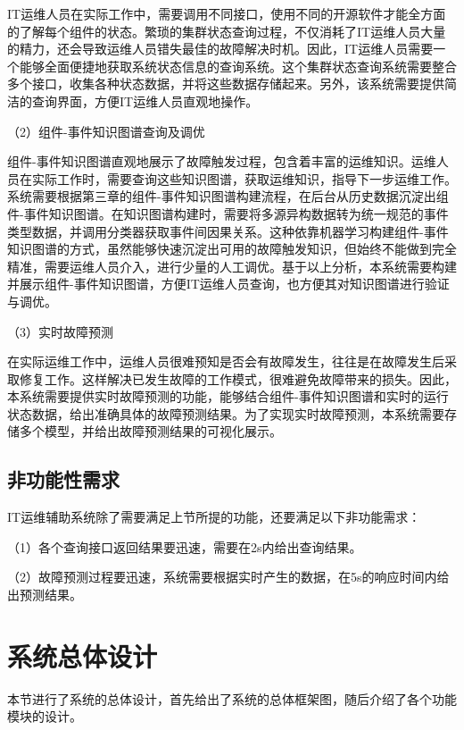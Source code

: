 IT运维人员在实际工作中，需要调用不同接口，使用不同的开源软件才能全方面的了解每个组件的状态。繁琐的集群状态查询过程，不仅消耗了IT运维人员大量的精力，还会导致运维人员错失最佳的故障解决时机。因此，IT运维人员需要一个能够全面便捷地获取系统状态信息的查询系统。这个集群状态查询系统需要整合多个接口，收集各种状态数据，并将这些数据存储起来。另外，该系统需要提供简洁的查询界面，方便IT运维人员直观地操作。

（2）组件-事件知识图谱查询及调优

组件-事件知识图谱直观地展示了故障触发过程，包含着丰富的运维知识。运维人员在实际工作时，需要查询这些知识图谱，获取运维知识，指导下一步运维工作。系统需要根据第三章的组件-事件知识图谱构建流程，在后台从历史数据沉淀出组件-事件知识图谱。在知识图谱构建时，需要将多源异构数据转为统一规范的事件类型数据，并调用分类器获取事件间因果关系。这种依靠机器学习构建组件-事件知识图谱的方式，虽然能够快速沉淀出可用的故障触发知识，但始终不能做到完全精准，需要运维人员介入，进行少量的人工调优。基于以上分析，本系统需要构建并展示组件-事件知识图谱，方便IT运维人员查询，也方便其对知识图谱进行验证与调优。

（3）实时故障预测

在实际运维工作中，运维人员很难预知是否会有故障发生，往往是在故障发生后采取修复工作。这样解决已发生故障的工作模式，很难避免故障带来的损失。因此，本系统需要提供实时故障预测的功能，能够结合组件-事件知识图谱和实时的运行状态数据，给出准确具体的故障预测结果。为了实现实时故障预测，本系统需要存储多个模型，并给出故障预测结果的可视化展示。


\subsection{非功能性需求}
IT运维辅助系统除了需要满足上节所提的功能，还要满足以下非功能需求：

（1）各个查询接口返回结果要迅速，需要在2s内给出查询结果。

（2）故障预测过程要迅速，系统需要根据实时产生的数据，在5s的响应时间内给出预测结果。


\section{系统总体设计}
本节进行了系统的总体设计，首先给出了系统的总体框架图，随后介绍了各个功能模块的设计。
